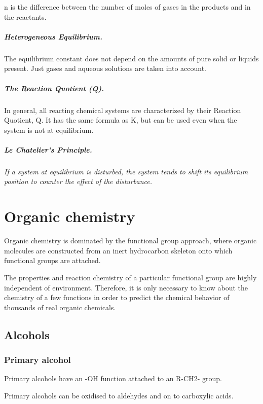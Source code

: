 \documentclass[12pt, oneside]{book}
\begin{document}
n is the difference between the number of moles of gases in the products and in
the reactants.

\paragraph{Heterogeneous Equilibrium.} The equilibrium constant does not depend
on the amounts of pure solid
or liquids present. Just gases and aqueous solutions are taken into account.

\paragraph{The Reaction Quotient (Q).} In general, all reacting chemical
systems are characterized by their Reaction Quotient, Q. It has the same
formula as K, but can be used even when the system is not at equilibrium.

\paragraph{Le Chatelier's Principle.} \textit{If a system at equilibrium is
disturbed, the system tends to shift its equilibrium position to counter the
effect of the disturbance.}

\chapter{Organic chemistry}
Organic chemistry is dominated by the functional group approach, where organic
molecules are constructed from an inert hydrocarbon skeleton onto which
functional groups are attached.

The properties and reaction chemistry of a particular functional group are
highly independent of environment. Therefore, it is only necessary to know about
the chemistry of a few functions in order to predict the chemical behavior of
thousands of real organic chemicals.

\section{Alcohols}
\subsection{Primary alcohol}
Primary alcohols have an -OH function attached to an R-CH2- group.

Primary alcohols can be oxidised to aldehydes and on to carboxylic acids.
\end{document}

